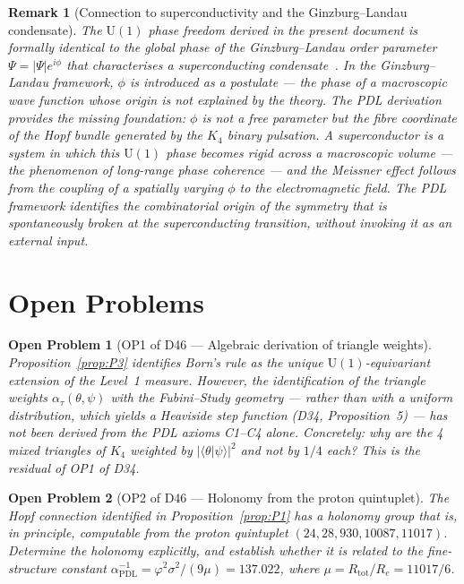 \documentclass[12pt,a4paper]{article}
\newtheorem{remark}[theorem]{Remark}
\newtheorem{openproblem}{Open Problem}
\begin{document}
\begin{remark}[Connection to superconductivity and the Ginzburg--Landau condensate]
\label{rem:superconductivity}
The $\mathrm{U}(1)$ phase freedom derived in the present document is formally identical
to the global phase of the Ginzburg--Landau order parameter $\Psi = |\Psi|e^{i\phi}$
that characterises a superconducting condensate~\cite{Ginzburg_1950}. In the
Ginzburg--Landau framework, $\phi$ is introduced as a postulate — the phase of a
macroscopic wave function whose origin is not explained by the theory. The PDL
derivation provides the missing foundation: $\phi$ is not a free parameter but the
fibre coordinate of the Hopf bundle generated by the $K_4$ binary pulsation. A
superconductor is a system in which this $\mathrm{U}(1)$ phase becomes \emph{rigid}
across a macroscopic volume — the phenomenon of long-range phase coherence — and the
Meissner effect follows from the coupling of a spatially varying $\phi$ to the
electromagnetic field. The PDL framework identifies the combinatorial origin of the
symmetry that is spontaneously broken at the superconducting transition, without
invoking it as an external input.
\end{remark}

\section{Open Problems}
\label{sec:open}

\begin{openproblem}[OP1 of D46 --- Algebraic derivation of triangle weights]
\label{op:weights}
Proposition~\ref{prop:P3} identifies Born's rule as the unique $\mathrm{U}(1)$-equivariant
extension of the Level~1 measure. However, the identification of the triangle weights
$\alpha_\tau(\theta,\psi)$ with the Fubini--Study geometry — rather than with a uniform
distribution, which yields a Heaviside step function (D34, Proposition~5) — has not
been derived from the PDL axioms C1--C4 alone. Concretely: why are the 4 mixed triangles
of $K_4$ weighted by $|\langle\theta|\psi\rangle|^2$ and not by $1/4$ each? This is
the residual of OP1 of D34.
\end{openproblem}

\begin{openproblem}[OP2 of D46 --- Holonomy from the proton quintuplet]
\label{op:holonomy}
The Hopf connection identified in Proposition~\ref{prop:P1} has a holonomy group that
is, in principle, computable from the proton quintuplet $(24, 28, 930, 10087, 11017)$.
Determine the holonomy explicitly, and establish whether it is related to the
fine-structure constant $\alpha_\mathrm{PDL}^{-1} = \varphi^2 \sigma^2/(9\mu) = 137.022$,
where $\mu = R_{\mathrm{tot}}/R_e = 11017/6$.
\end{openproblem}
\end{document}
